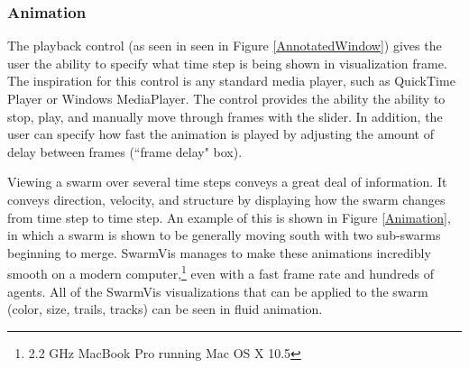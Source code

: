 \documentclass[conference]{IEEEtran}
\begin{document}
\subsubsection{Animation}

The playback control (as seen in  seen in Figure \ref{AnnotatedWindow})
gives the user the ability to specify what time step is being shown in visualization frame.
The inspiration for this control is any standard media player, such as QuickTime Player or Windows MediaPlayer.
The control provides the ability the ability to stop, play, and manually move through frames with the slider.
In addition, the user can specify how fast the animation is played by adjusting the amount of delay between
frames (``frame delay" box).

Viewing a swarm over several time steps conveys a great deal of information.
It conveys direction, velocity, and structure by displaying how the swarm changes from time step to time step.
An example of this is shown in Figure \ref{Animation}, in which a swarm is shown to be
generally moving south with two sub-swarms beginning to merge.
SwarmVis manages to make these animations incredibly smooth on a modern
computer,\footnote{2.2 GHz MacBook Pro running Mac OS X 10.5} even with a fast frame rate and hundreds of agents.
All of the SwarmVis visualizations  that can be applied to the swarm (color, size, trails, tracks) can be seen in fluid animation.
\end{document}
